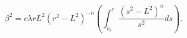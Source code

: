 \begin{equation}
\beta^{2}=c\lambda rL^{2}(r^{2}-L^{2})^{-n}\left(
\int_{r_{b}}^{r}\frac{(s^{2}-L^{2})^{n}}{s^{2}}ds\right). \label{beta1}
\end{equation}

